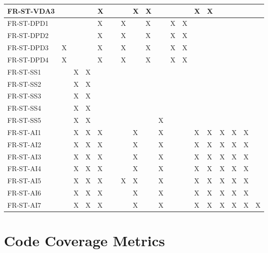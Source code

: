 \documentclass[12pt, titlepage]{article}
\begin{document}
\begin{table}[!ht]
{\begin{tabular}{|l|l|l|l|l|l|l|l|l|l|l|l|l|l|l|l|l|l|}
      FR-ST-VDA3 & ~ & ~ & ~ & X & ~ & ~ & X & X & ~ & ~ & ~ & X & X & ~ & ~ & ~ & ~ \\ \hline
      FR-ST-DPD1 & ~ & ~ & ~ & X & ~ & X & ~ & X & ~ & X & X & ~ & ~ & ~ & ~ & ~ & ~ \\ \hline
      FR-ST-DPD2 & ~ & ~ & ~ & X & ~ & X & ~ & X & ~ & X & X & ~ & ~ & ~ & ~ & ~ & ~ \\ \hline
      FR-ST-DPD3 & X & ~ & ~ & X & ~ & X & ~ & X & ~ & X & X & ~ & ~ & ~ & ~ & ~ & ~ \\ \hline
      FR-ST-DPD4 & X & ~ & ~ & X & ~ & X & ~ & X & ~ & X & X & ~ & ~ & ~ & ~ & ~ & ~ \\ \hline
      FR-ST-SS1 & ~ & X & X & ~ & ~ & ~ & ~ & ~ & ~ & ~ & ~ & ~ & ~ & ~ & ~ & ~ & ~ \\ \hline
      FR-ST-SS2 & ~ & X & X & ~ & ~ & ~ & ~ & ~ & ~ & ~ & ~ & ~ & ~ & ~ & ~ & ~ & ~ \\ \hline
      FR-ST-SS3 & ~ & X & X & ~ & ~ & ~ & ~ & ~ & ~ & ~ & ~ & ~ & ~ & ~ & ~ & ~ & ~ \\ \hline
      FR-ST-SS4 & ~ & X & X & ~ & ~ & ~ & ~ & ~ & ~ & ~ & ~ & ~ & ~ & ~ & ~ & ~ & ~ \\ \hline
      FR-ST-SS5 & ~ & X & X & ~ & ~ & ~ & ~ & ~ & X & ~ & ~ & ~ & ~ & ~ & ~ & ~ & ~ \\ \hline
      FR-ST-AI1 & ~ & X & X & X & ~ & ~ & X & ~ & X & ~ & ~ & X & X & X & X & X & ~ \\ \hline
      FR-ST-AI2 & ~ & X & X & X & ~ & ~ & X & ~ & X & ~ & ~ & X & X & X & X & X & ~ \\ \hline
      FR-ST-AI3 & ~ & X & X & X & ~ & ~ & X & ~ & X & ~ & ~ & X & X & X & X & X & ~ \\ \hline
      FR-ST-AI4 & ~ & X & X & X & ~ & ~ & X & ~ & X & ~ & ~ & X & X & X & X & X & ~ \\ \hline
      FR-ST-AI5 & ~ & X & X & X & ~ & X & X & ~ & X & ~ & ~ & X & X & X & X & X & ~ \\ \hline
      FR-ST-AI6 & ~ & X & X & X & ~ & ~ & X & ~ & X & ~ & ~ & X & X & X & X & X & ~ \\ \hline
      FR-ST-AI7 & ~ & X & X & X & ~ & ~ & X & ~ & X & ~ & ~ & X & X & X & X & X & X \\ \hline
  \end{tabular}
  }
\end{table}

\newpage

\section{Code Coverage Metrics}
\end{document}
